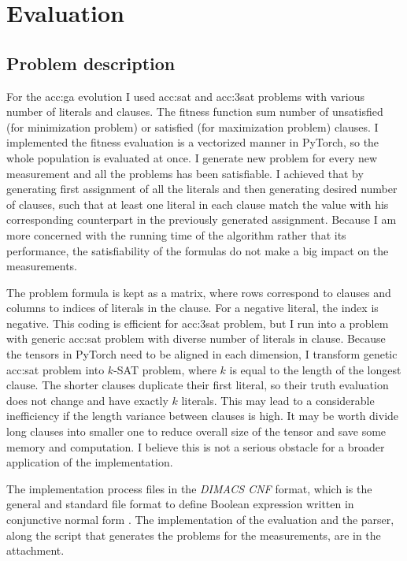 \chapter{Evaluation}





\section{Problem description}

For the \acrlong{acc:ga} evolution I used \acrshort{acc:sat} and \acrshort{acc:3sat} problems with various number of literals and clauses. The fitness function sum number of unsatisfied (for minimization problem) or satisfied (for maximization problem) clauses. I implemented the fitness evaluation is a vectorized manner in PyTorch, so the whole population is evaluated at once. I generate new problem for every new measurement and all the problems has been satisfiable. I achieved that by generating first assignment of all the literals and then generating desired number of clauses, such that at least one literal in each clause match the value with his corresponding counterpart in the previously generated assignment. Because I am more concerned with the running time of the algorithm rather that its performance, the satisfiability of the formulas do not make a big impact on the measurements.

The problem formula is kept as a matrix, where rows correspond to clauses and columns to indices of literals in the clause. For a negative literal, the index is negative. This coding is efficient for \acrshort{acc:3sat} problem, but I run into a problem with generic \acrshort{acc:sat} problem with diverse number of literals in clause. Because the tensors in PyTorch need to be aligned in each dimension, I transform genetic \acrshort{acc:sat} problem into $k$-SAT problem, where $k$ is equal to the length of the longest clause. The shorter clauses duplicate their first literal, so their truth evaluation does not change and have exactly $k$ literals. This may lead to a considerable inefficiency if the length variance between clauses is high. It may be worth divide long clauses into smaller one to reduce overall size of the tensor and save some memory and computation. I believe this is not a serious obstacle for a broader application of the implementation.

The implementation process files in the \textit{DIMACS CNF} format, which is the general and standard file format to define Boolean expression written in conjunctive normal form \citep{challenge1993satisfiability}. The implementation of the evaluation and the parser, along the script that generates the problems for the measurements, are in the attachment.

